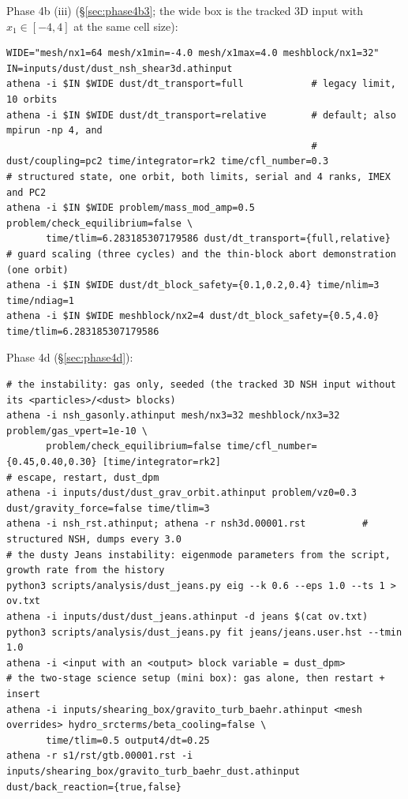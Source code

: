 \documentclass[11pt]{article}
\begin{document}
\noindent Phase 4b (iii) (\S\ref{sec:phase4b3}; the wide box is the tracked 3D input with
$x_1 \in [-4,4]$ at the same cell size):
\begin{lstlisting}
WIDE="mesh/nx1=64 mesh/x1min=-4.0 mesh/x1max=4.0 meshblock/nx1=32"
IN=inputs/dust/dust_nsh_shear3d.athinput
athena -i $IN $WIDE dust/dt_transport=full            # legacy limit, 10 orbits
athena -i $IN $WIDE dust/dt_transport=relative        # default; also mpirun -np 4, and
                                                      # dust/coupling=pc2 time/integrator=rk2 time/cfl_number=0.3
# structured state, one orbit, both limits, serial and 4 ranks, IMEX and PC2
athena -i $IN $WIDE problem/mass_mod_amp=0.5 problem/check_equilibrium=false \
       time/tlim=6.283185307179586 dust/dt_transport={full,relative}
# guard scaling (three cycles) and the thin-block abort demonstration (one orbit)
athena -i $IN $WIDE dust/dt_block_safety={0.1,0.2,0.4} time/nlim=3 time/ndiag=1
athena -i $IN $WIDE meshblock/nx2=4 dust/dt_block_safety={0.5,4.0} time/tlim=6.283185307179586
\end{lstlisting}

\noindent Phase 4d (\S\ref{sec:phase4d}):
\begin{lstlisting}
# the instability: gas only, seeded (the tracked 3D NSH input without its <particles>/<dust> blocks)
athena -i nsh_gasonly.athinput mesh/nx3=32 meshblock/nx3=32 problem/gas_vpert=1e-10 \
       problem/check_equilibrium=false time/cfl_number={0.45,0.40,0.30} [time/integrator=rk2]
# escape, restart, dust_dpm
athena -i inputs/dust/dust_grav_orbit.athinput problem/vz0=0.3 dust/gravity_force=false time/tlim=3
athena -i nsh_rst.athinput; athena -r nsh3d.00001.rst          # structured NSH, dumps every 3.0
# the dusty Jeans instability: eigenmode parameters from the script, growth rate from the history
python3 scripts/analysis/dust_jeans.py eig --k 0.6 --eps 1.0 --ts 1 > ov.txt
athena -i inputs/dust/dust_jeans.athinput -d jeans $(cat ov.txt)
python3 scripts/analysis/dust_jeans.py fit jeans/jeans.user.hst --tmin 1.0
athena -i <input with an <output> block variable = dust_dpm>
# the two-stage science setup (mini box): gas alone, then restart + insert
athena -i inputs/shearing_box/gravito_turb_baehr.athinput <mesh overrides> hydro_srcterms/beta_cooling=false \
       time/tlim=0.5 output4/dt=0.25
athena -r s1/rst/gtb.00001.rst -i inputs/shearing_box/gravito_turb_baehr_dust.athinput dust/back_reaction={true,false}
\end{lstlisting}
\end{document}
